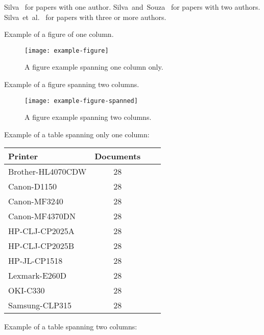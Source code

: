 \documentclass[10pt,twocolumn,letterpaper]{article}
\newcommand{\CITEONE}[2]{\mbox{#1 \cite{#2}}}
\newcommand{\CITETWO}[3]{\mbox{#1 and #2 \cite{#3}}}
\newcommand{\CITEN}[2]{\mbox{#1 et al. \cite{#2}}}
\begin{document}
\CITEONE{Silva}{Silva_2010} for papers with one author.
\CITETWO{Silva}{Souza}{Silva_2010b} for papers with two authors.
\CITEN{Silva}{Silva_2010c} for papers with three or more authors.

Example of a figure of one column. 
\begin{figure}
\begin{center}
	\texttt{[image: example-figure]}
	\caption{A figure example spanning one column only.\label{fig:label}}   
\end{center} 
\end{figure}   

Example of a figure spanning two columns. 
\begin{figure*}
\begin{center}
	\texttt{[image: example-figure-spanned]}
	\caption{A figure example spanning two columns.\label{fig:label2}}   
\end{center} 
\end{figure*}

Example of a table spanning only one column: 

\begin{table}
\begin{center}
\begin{tabular}{l*{2}{c}r}
Printer           & Documents \\
\hline
Brother-HL4070CDW & 28 \\
Canon-D1150 & 28 \\
Canon-MF3240 & 28 \\
Canon-MF4370DN & 28 \\
HP-CLJ-CP2025A & 28 \\
HP-CLJ-CP2025B & 28 \\
HP-JL-CP1518 & 28 \\
Lexmark-E260D & 28 \\
OKI-C330 & 28 \\
Samsung-CLP315 & 28 \\
\end{tabular}
\end{center}
\end{table}

Example of a table spanning two columns: 
\end{document}
